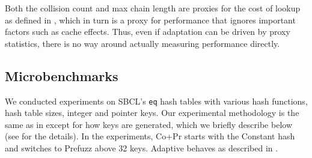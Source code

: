 \documentclass[sigconf]{acmart}
\newcommand*\lisp[1]{\texttt{#1}}
\renewcommand{\label}[1]{%
    \gdef\sfname{sf:##1}}%
\begin{document}
Both the collision count and max chain length are proxies for the cost of lookup as defined in , which in turn is a proxy for performance that ignores important factors such as cache effects.
Thus, even if adaptation can be driven by proxy statistics, there is no way around actually measuring performance directly.

\subsection{Microbenchmarks}
\label{sec:microbenchmarks}

We conducted experiments on SBCL's \lisp{eq} hash tables with various hash functions, hash table sizes, integer and pointer keys.
Our experimental methodology is the same as in  except for how keys are generated, which we briefly describe below (see  for the details).
In the experiments, Co+Pr starts with the Constant hash and switches to Prefuzz above 32 keys.
Adaptive behaves as described in .
\end{document}
